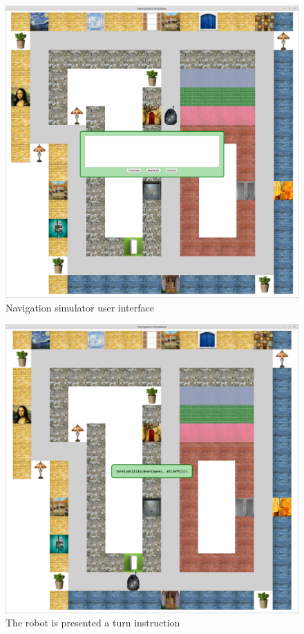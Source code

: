 \documentclass[11pt,letterpaper]{article}
\begin{document}
\begin{figure}[ht!]
\includegraphics[scale=0.15]{interface.pdf}
\caption{Navigation simulator user interface}\label{fig:interface}
\end{figure}

\begin{figure}[ht!]
\includegraphics[scale=0.15]{turninst.pdf}
\caption{The robot is presented a turn instruction}\label{fig:turninst}
\end{figure}
\end{document}
